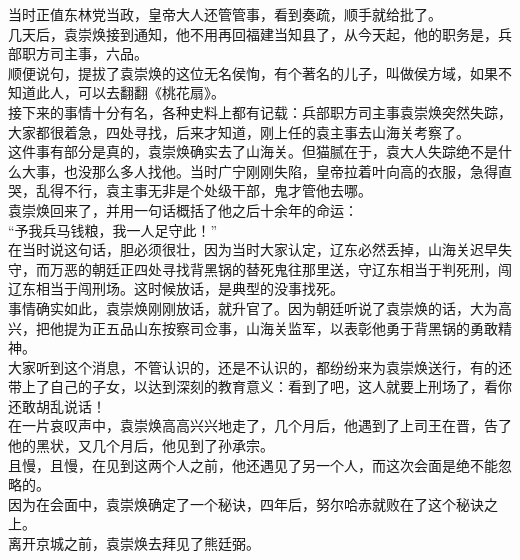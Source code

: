 \begin{multicols}{\theparacolNo}
当时正值东林党当政，皇帝大人还管管事，看到奏疏，顺手就给批了。\\

几天后，袁崇焕接到通知，他不用再回福建当知县了，从今天起，他的职务是，兵部职方司主事，六品。\\

顺便说句，提拔了袁崇焕的这位无名侯恂，有个著名的儿子，叫做侯方域，如果不知道此人，可以去翻翻《桃花扇》。\\

接下来的事情十分有名，各种史料上都有记载：兵部职方司主事袁崇焕突然失踪，大家都很着急，四处寻找，后来才知道，刚上任的袁主事去山海关考察了。\\

这件事有部分是真的，袁崇焕确实去了山海关。但猫腻在于，袁大人失踪绝不是什么大事，也没那么多人找他。当时广宁刚刚失陷，皇帝拉着叶向高的衣服，急得直哭，乱得不行，袁主事无非是个处级干部，鬼才管他去哪。\\

袁崇焕回来了，并用一句话概括了他之后十余年的命运：\\

“予我兵马钱粮，我一人足守此！”\\

在当时说这句话，胆必须很壮，因为当时大家认定，辽东必然丢掉，山海关迟早失守，而万恶的朝廷正四处寻找背黑锅的替死鬼往那里送，守辽东相当于判死刑，闯辽东相当于闯刑场。这时候放话，是典型的没事找死。\\

事情确实如此，袁崇焕刚刚放话，就升官了。因为朝廷听说了袁崇焕的话，大为高兴，把他提为正五品山东按察司佥事，山海关监军，以表彰他勇于背黑锅的勇敢精神。\\

大家听到这个消息，不管认识的，还是不认识的，都纷纷来为袁崇焕送行，有的还带上了自己的子女，以达到深刻的教育意义：看到了吧，这人就要上刑场了，看你还敢胡乱说话！\\

在一片哀叹声中，袁崇焕高高兴兴地走了，几个月后，他遇到了上司王在晋，告了他的黑状，又几个月后，他见到了孙承宗。\\

且慢，且慢，在见到这两个人之前，他还遇见了另一个人，而这次会面是绝不能忽略的。\\

因为在会面中，袁崇焕确定了一个秘诀，四年后，努尔哈赤就败在了这个秘诀之上。\\

离开京城之前，袁崇焕去拜见了熊廷弼。\\


\end{multicols}
